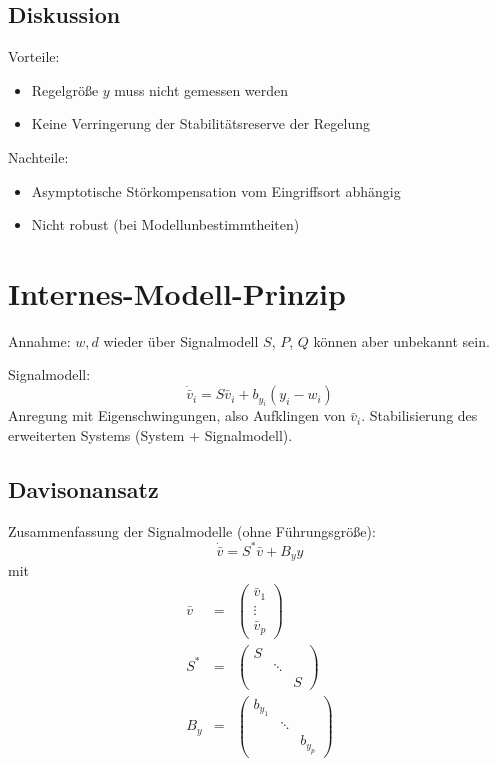 \subsection{Diskussion}
Vorteile:
\begin{itemize}
    \item Regelgröße $y$ muss nicht gemessen werden
    \item Keine Verringerung der Stabilitätsreserve der Regelung
\end{itemize}

Nachteile:
\begin{itemize}
    \item Asymptotische Störkompensation vom Eingriffsort abhängig
    \item Nicht robust (bei Modellunbestimmtheiten)
\end{itemize}
 
\section{Internes-Modell-Prinzip}
Annahme: $w, d$ wieder über Signalmodell $S$, $P$, $Q$ können aber unbekannt sein.

Signalmodell:
\begin{equation}
    \dot{\bar{v}}_i = S \bar{v}_i + b_{y_i} (y_i - w_i)
\end{equation}
Anregung mit Eigenschwingungen, also Aufklingen von $\bar{v}_i$. Stabilisierung
des erweiterten Systems (System + Signalmodell).

\subsection{Davisonansatz}
Zusammenfassung der Signalmodelle (ohne Führungsgröße):
\begin{equation}
    \dot{\bar{v}} = S^* \bar{v} + B_y y
\end{equation}
mit
\begin{eqnarray}
    \bar{v} &=& \begin{pmatrix}
            \bar{v}_1 \\ \vdots \\ \bar{v}_p
        \end{pmatrix} \\
    S^* &=& \begin{pmatrix}
            S \\
             & \ddots \\
             & & S
        \end{pmatrix} \\
    B_y &=& \begin{pmatrix}
            b_{y_1} \\
             & \ddots \\
             & & b_{y_p}
        \end{pmatrix}
\end{eqnarray}

